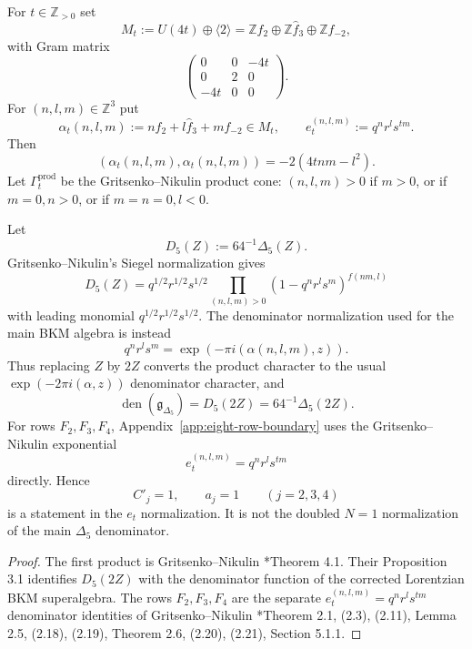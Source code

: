 \documentclass[11pt]{memoir}
\newcommand{\Z}{\mathbb{Z}} \newcommand{\C}{\mathbb{C}}
\begin{document}
\begin{definition}
For $t\in\Z_{>0}$ set
$$
M_t:=U(4t)\oplus\langle 2\rangle
=\Z f_2\oplus\Z\widehat f_3\oplus\Z f_{-2},
$$
with Gram matrix
$$
\left(\begin{array}{ccc}
0&0&-4t\\
0&2&0\\
-4t&0&0
\end{array}\right).
$$
For $(n,l,m)\in\Z^3$ put
$$
\alpha_t(n,l,m):=nf_2+l\widehat f_3+mf_{-2}\in M_t,\qquad
e_t^{(n,l,m)}:=q^nr^ls^{tm}.
$$
Then
$$
(\alpha_t(n,l,m),\alpha_t(n,l,m))
=-2(4tnm-l^2).
$$
Let $\Gamma_t^{\mathrm{prod}}$ be the Gritsenko--Nikulin product cone:
$(n,l,m)>0$ if $m>0$, or if $m=0,n>0$, or if $m=n=0,l<0$.
\end{definition}

\begin{lemma}
\label{lem:two-denominator-normalizations}
Let
$$D_5(Z):=64^{-1}\Delta_5(Z).$$
Gritsenko--Nikulin's Siegel normalization gives
$$
D_5(Z)=q^{1/2}r^{1/2}s^{1/2}
\prod_{(n,l,m)>0}
(1-q^nr^ls^m)^{f(nm,l)}
$$
with leading monomial $q^{1/2}r^{1/2}s^{1/2}$.
The denominator normalization used for the main BKM algebra is instead
$$
q^nr^ls^m=\exp(-\pi i(\alpha(n,l,m),z)).
$$
Thus replacing $Z$ by $2Z$ converts the product character to the usual
$\exp(-2\pi i(\alpha,z))$ denominator character, and
$$
\operatorname{den}(\mathfrak g_{\Delta_5})=D_5(2Z)
=64^{-1}\Delta_5(2Z).
$$
For rows $F_2,F_3,F_4$, Appendix~\ref{app:eight-row-boundary} uses the
Gritsenko--Nikulin exponential
$$e_t^{(n,l,m)}=q^nr^ls^{tm}$$
directly.  Hence
$$C'_j=1,\qquad a_j=1\qquad(j=2,3,4)$$
is a statement in the $e_t$ normalization.  It is not the doubled
$N=1$ normalization of the main $\Delta_5$ denominator.
\end{lemma}

\begin{proof}
The first product is Gritsenko--Nikulin \cite{GN}*{Theorem 4.1}.
Their Proposition 3.1 identifies $D_5(2Z)$ with the denominator
function of the corrected Lorentzian BKM superalgebra.  The rows
$F_2,F_3,F_4$ are the separate $e_t^{(n,l,m)}=q^nr^ls^{tm}$
denominator identities of Gritsenko--Nikulin
\cite{GNII}*{Theorem 2.1, (2.3), (2.11), Lemma 2.5, (2.18), (2.19),
Theorem 2.6, (2.20), (2.21), Section 5.1.1}.
\end{proof}
\end{document}

